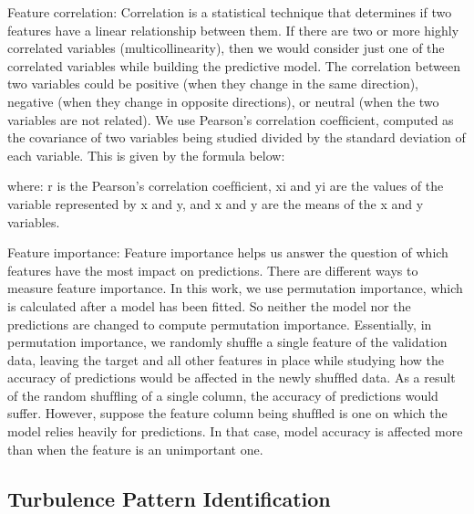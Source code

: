 
Feature correlation: Correlation is a statistical technique that determines if two features have a linear
relationship between them. If there are two or more highly correlated variables (multicollinearity), then we would consider just one of the correlated variables while building the predictive model. The correlation between two variables could be positive (when they change in the same direction), negative (when they change in opposite directions), or neutral (when the two variables are not related). We use Pearson’s correlation coefﬁcient, computed as the covariance of two variables being studied divided by the standard deviation of each variable. This is given by the formula below:


where:
r is the Pearson’s correlation coefﬁcient, xi and yi are the values of the variable represented by x and y, and
x and y are the means of the x and y variables.

Feature importance: Feature importance helps us answer the question of which features have the
most impact on predictions. There are different ways to measure feature importance. In this work, we use
permutation importance, which is calculated after a model has been ﬁtted. So neither the model nor the
predictions are changed to compute permutation importance. Essentially, in permutation importance, we
randomly shufﬂe a single feature of the validation data, leaving the target and all other features in place while studying how the accuracy of predictions would be affected in the newly shufﬂed data. As a result of the random shufﬂing of a single column, the accuracy of predictions would suffer. However, suppose the feature column being shufﬂed is one on which the model relies heavily for predictions. In that case, model accuracy is affected more than when the feature is an unimportant one.

\subsection{Turbulence Pattern Identiﬁcation}

